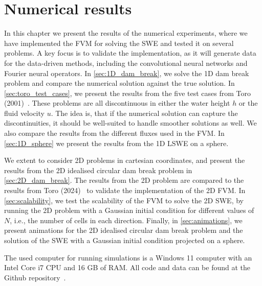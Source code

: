 \chapter{Numerical results}\label{ch:numerical_results}
In this chapter we present the results of the numerical experiments, where we have implemented the FVM for solving the SWE and tested it on several problems.
A key focus is to validate the implementation, as it will generate data for the data-driven methods, including the convolutional neural networks and Fourier neural operators.
In \autoref{sec:1D_dam_break}, we solve the 1D dam break problem and compare the numerical solution against the true solution.
In \autoref{sec:toro_test_cases}, we present the results from the five test cases from Toro (2001)~\cite{Toro2001-Shock}.
These problems are all discontinuous in either the water height $h$ or the fluid velocity $u$.
The idea is, that if the numerical solution can capture the discontinuities, it should be well-suited to handle smoother solutions as well.
We also compare the results from the different fluxes used in the FVM.
In \autoref{sec:1D_sphere} we present the results from the 1D LSWE on a sphere.

We extent to consider 2D problems in cartesian coordinates, and present the results from the 2D idealised circular dam break problem in \autoref{sec:2D_dam_break}.
The results from the 2D problem are compared to the results from Toro (2024)~\cite{Toro2024} to validate the implementation of the 2D FVM.
In \autoref{sec:scalability}, we test the scalability of the FVM to solve the 2D SWE, by running the 2D problem with a Gaussian initial condition for different values of $N$, i.e., the number of cells in each direction.
Finally, in \autoref{sec:animations}, we present animations for the 2D idealised circular dam break problem and the solution of the SWE with a Gaussian initial condition projected on a sphere.

The used computer for running simulations is a Windows 11 computer with an Intel Core i7 CPU and 16 GB of RAM.
All code and data can be found at the Github repository~\cite{Github_SWE}.

